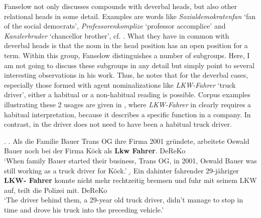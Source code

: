 Fanselow not only discusses compounds with deverbal heads, but also
 other relational heads in some detail. Examples are words
like \emph{Sozialdemokratenfan} `fan of the social democrats', \emph{Professorenkomplize} `professor accomplice' and
\emph{Kanzlerbruder} `chancellor brother', cf. \citet[81]{Fanselow:1981}. What they have in
common with deverbal heads is that the noun in the head
position has an open position for a term. Within this group, Fanselow
distinguishes a number of subgroups. Here, I am not going to discuss
these subgroups in any detail but simply point to several interesting
observations in his work. Thus, he notes that for the deverbal cases,
especially those formed with agent nominalizations like
\emph{LKW-Fahrer} `truck driver', either a habitual or a non-habitual reading is
possible. Corpus examples illustrating these 2 usages are given in \Next, where \emph{LKW-Fahrer} in \Next[a] clearly requires a habitual
interpretation, because it describes a specific function in a company. In
contrast, in \Next[b] the driver does not need to have been a habitual truck driver.

\ex. \label{ex:LKW_Fahrer}
\a. \label{ex:LKW_Fahrer1}
Als die Familie Bauer Trans OG ihre Firma 2001 gründete, arbeitete Oswald
Bauer noch bei der Firma Köck als \textbf{Lkw Fahrer}. DeReKo\\
`When family Bauer started their business, Trans OG, in 2001, Oswald Bauer was still working as a truck driver for Köck.'
\b. \label{ex:LKW_Fahrer2} 	
Ein dahinter fahrender 29-jähriger \textbf{LKW- Fahrer} konnte nicht mehr rechtzeitig
bremsen und fuhr mit seinem LKW auf, teilt die Polizei mit. DeReKo 
\\
`The driver behind them, a 29-year old truck driver, didn't manage to stop in time and drove his truck into the preceding vehicle.' 

